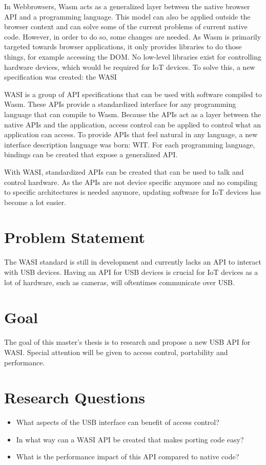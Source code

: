 In Webbrowsers, \acrfull{Wasm} acts as a generalized layer between the native browser API and a programming language. This model can also be applied outside the browser context and can solve some of the current problems of current native code. However, in order to do so, some changes are needed. As \acrshort{Wasm} is primarily targeted towards browser applications, it only provides libraries to do those things, for example accessing the DOM. No low-level libraries exist for controlling hardware devices, which would be required for \acrshort{IoT} devices. To solve this, a new specification was created: the \acrfull{WASI}

\acrshort{WASI} is a group of API specifications that can be used with software compiled to \acrshort{Wasm}. These APIs provide a standardized interface for any programming language that can compile to \acrshort{Wasm}. Because the APIs act as a layer between the native APIs and the application, access control can be applied to control what an application can access. To provide APIs that feel natural in any language, a new interface description language was born: \acrfull{WIT}. For each programming language, bindings can be created that expose a generalized API.

With \acrshort{WASI}, standardized APIs can be created that can be used to talk and control hardware. As the APIs are not device specific anymore and no compiling to specific architectures is needed anymore, updating software for \acrshort{IoT} devices has become a lot easier.

\section*{Problem Statement}

The \acrshort{WASI} standard is still in development and currently lacks an API to interact with USB devices. Having an API for USB devices is crucial for \acrshort{IoT} devices as a lot of hardware, such as cameras, will oftentimes communicate over USB.

\section*{Goal}

The goal of this master's thesis is to research and propose a new USB API for \acrshort{WASI}. Special attention will be given to access control, portability and performance.

\section*{Research Questions}

\begin{itemize}

\item What aspects of the USB interface can benefit of access control?

\item In what way can a WASI API be created that makes porting code easy?

\item What is the performance impact of this API compared to native code?

\end{itemize}

